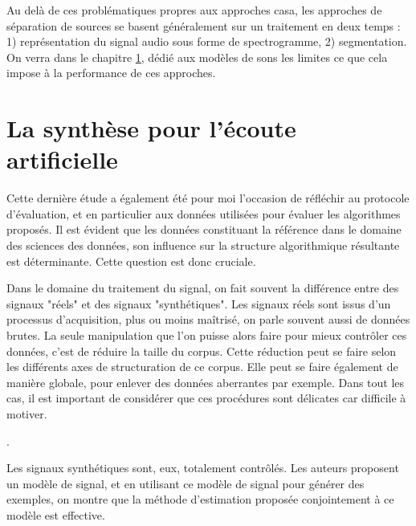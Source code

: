 Au delà de ces problématiques propres aux approches casa, les approches de séparation de sources se basent généralement sur un traitement en deux temps : 1) représentation du signal audio sous forme de spectrogramme, 2) segmentation. On verra dans le chapitre \ref{}, dédié aux modèles de sons les limites ce que cela impose à la performance de ces approches.

\section{La synthèse pour l'écoute artificielle}

Cette dernière étude a également été pour moi l'occasion de réfléchir au protocole d'évaluation, et en particulier aux données utilisées pour évaluer les algorithmes proposés. Il est évident que les données constituant la référence dans le domaine des sciences des données, son influence sur la structure algorithmique résultante est déterminante. Cette question est donc cruciale.

Dans le domaine du traitement du signal, on fait souvent la différence entre des signaux "réels" et des signaux "synthétiques". Les signaux réels sont issus d'un processus d'acquisition, plus ou moins maîtrisé, on parle souvent aussi de données brutes. La seule manipulation que l'on puisse alors faire pour mieux contrôler ces données, c'est de réduire la taille du corpus. Cette réduction peut se faire selon les différents axes de structuration de ce corpus. Elle peut se faire également de manière globale, pour enlever des données aberrantes par exemple. Dans tout les cas, il est important de considérer que ces procédures sont délicates car difficile à motiver.

.


Les signaux synthétiques sont, eux, totalement contrôlés. Les auteurs proposent un modèle de signal, et en utilisant ce modèle de signal pour générer des exemples, on montre que la méthode d'estimation proposée conjointement à ce modèle est effective.

